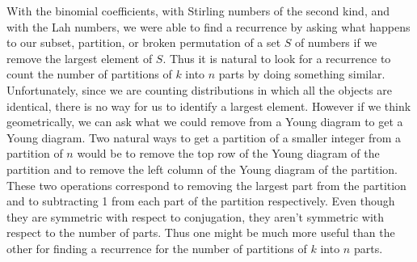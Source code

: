 \documentclass[10pt,]{book}
\theoremstyle{plain}
\theoremstyle{definition}
\numberwithin{equation}{chapter}
\begin{document}
With the binomial coefficients, with Stirling numbers of the second kind, and with the Lah numbers, we were able to find a recurrence by asking what happens to our subset, partition, or broken permutation of a set \(S\) of numbers if we remove the largest element of \(S\). Thus it is natural to look for a recurrence to count the number of partitions of \(k\) into \(n\) parts by doing something similar. Unfortunately, since we are counting distributions in which all the objects are identical, there is no way for us to identify a largest element. However if we think geometrically, we can ask what we could remove from a Young diagram to get a Young diagram. Two natural ways to get a partition of a smaller integer from a partition of \(n\) would be to remove the top row of the Young diagram of the partition and to remove the left column of the Young diagram of the partition. These two operations correspond to removing the largest part from the partition and to subtracting 1 from each part of the partition respectively. Even though they are symmetric with respect to conjugation, they aren't symmetric with respect to the number of parts. Thus one might be much more useful than the other for finding a recurrence for the number of partitions of \(k\) into \(n\) parts.%
\end{document}
